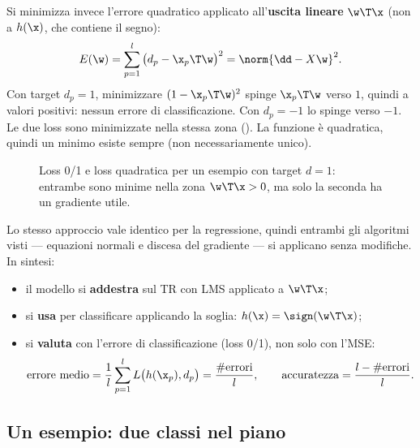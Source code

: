 \begin{idea}
Si minimizza invece l'errore quadratico applicato all'\textbf{uscita lineare} $\w\T\x$ (non a $h(\x)$, che
contiene il segno):
\[
E(\w) = \sum_{p=1}^{l}\big(d_p-\x_p\T\w\big)^2 = \norm{\dd-X\w}^2 .
\]
Con target $d_p=1$, minimizzare $(1-\x_p\T\w)^2$ spinge $\x_p\T\w$ verso $1$, quindi a valori positivi: nessun
errore di classificazione. Con $d_p=-1$ lo spinge verso $-1$. Le due loss sono minimizzate nella stessa zona
(). La funzione è quadratica, quindi un minimo esiste sempre (non necessariamente unico).
\end{idea}

\begin{figure}[ht]
\centering
{}
\caption{Loss 0/1 e loss quadratica per un esempio con target $d=1$: entrambe sono minime nella zona
$\w\T\x>0$, ma solo la seconda ha un gradiente utile.}
\label{fig:loss-liscia}
\end{figure}

Lo stesso approccio vale identico per la regressione, quindi entrambi gli algoritmi visti --- equazioni normali e
discesa del gradiente --- si applicano senza modifiche. In sintesi:
\begin{itemize}
  \item il modello si \textbf{addestra} sul TR con LMS applicato a $\w\T\x$;
  \item si \textbf{usa} per classificare applicando la soglia: $h(\x) = \sign(\w\T\x)$;
  \item si \textbf{valuta} con l'errore di classificazione (loss 0/1), non solo con l'MSE:
        \[
        \text{errore medio} = \frac1l\sum_{p=1}^{l}L\big(h(\x_p),d_p\big) = \frac{\#\text{errori}}{l},\qquad
        \text{accuratezza} = \frac{l-\#\text{errori}}{l}.
        \]
\end{itemize}

\subsection{Un esempio: due classi nel piano}
\label{sec:due-classi}

